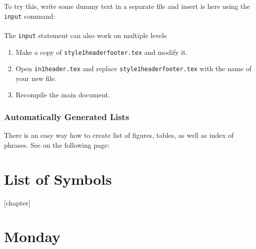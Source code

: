 \documentclass[a4paper,10pt]{report} %
\begin{document}
To try this, write some dummy text in a separate file and insert is here using the \texttt{input} command:\\
\\


The \texttt{input} statement can also work on multiple levels
\begin{enumerate}
    \item Make a copy of \texttt{style1headerfooter.tex} and modify it.
    \item Open \texttt{in1header.tex} and replace \texttt{style1headerfooter.tex} with the name of your new file.
    \item Recompile the main document.
\end{enumerate} 



\subsection{Automatically Generated Lists} %
There is an easy way how to create list of figures, tables, as well as index of phrases. 
 See on the following page: 

%  



   \tableofcontents
    \label{contents}
   \let\clearpage\relax
    \listoftables  
  \let\clearpage\relax
   \listoffigures\label{lof}  
    \chapter*{List of Symbols}
       

\setcounter{chapter}{1}
\setcounter{figure}{1} 

\newpage

\setcounter{chapter}{2}
[chapter]
\chapter{Monday} 
\end{document}
